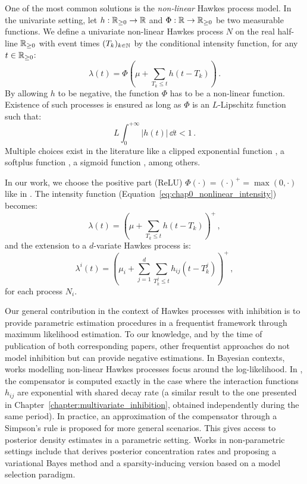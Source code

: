     One of the most common solutions is the \emph{non-linear} Hawkes process model. In the univariate setting, let $h:{\mathbb R}_{\geq 0} \to {\mathbb R}$ and $\Phi:{\mathbb R}\to{\mathbb R}_{\geq 0}$ be two measurable functions. We define a univariate non-linear Hawkes process $N$ on the real half-line ${\mathbb R}_{\geq 0}$ with event times $(T_k)_{k\in{\mathbb N}}$ by the conditional intensity function, for any $t\in{\mathbb R}_{\geq 0}$:
    \begin{equation}\label{eq:chap0_nonlinear_intensity}
      \lambda(t) = \Phi\left(\mu + \sum_{T_k \leq t}{h(t-T_k)}\right)\,.
    \end{equation}
    By allowing $h$ to be negative, the function $\Phi$ has to be a non-linear function. Existence of such processes is ensured as long as $\Phi$ is an $L$-Lipschitz function \parencite[Theorem 1]{Bremaud1996} such that:
    \[L\int_{0}^{+\infty}{\lvert h(t)\rvert\,\dd t} <1\,.\]
    Multiple choices exist in the literature like a clipped exponential function \parencite{Chornoboy1988,Carstensen2010,Gerhard2017}, a softplus function \parencite{Mei2017}, a sigmoid function \parencite{Menon2018}, among others.
    
    In our work, we choose the positive part (ReLU) $\Phi(\cdot) = (\cdot)^+ = \max(0, \cdot)$ like in \textcite{Lemonnier2014, Hansen2015, Lu2018, Costa2020}.
    The intensity function (Equation~\eqref{eq:chap0_nonlinear_intensity}) becomes:
    \begin{equation}\label{eq:chap0_nonlinear_univariate_intensity}
      \lambda(t) = \left(\mu + \sum_{T_k \leq t}{h(t-T_k)}\right)^+\,,
    \end{equation}
    and the extension to a $d$-variate Hawkes process is:
    \begin{equation}\label{eq:chap0_nonlinear_multivariate_intensity}
      \lambda^i(t) = \left(\mu_i + \sum_{j=1}^{d}\sum_{T_k^j \leq t}{h_{ij}(t-T_k^j)}\right)^+\,,
    \end{equation}
    for each process $N_i$.

    Our general contribution in the context of Hawkes processes with inhibition is to provide parametric estimation procedures in a frequentist framework through maximum likelihood estimation.
    To our knowledge, and by the time of publication of both corresponding papers, other frequentist approaches \parencite{Reynaud2014,Bacry2016} do not model inhibition but can provide negative estimations.
    In Bayesian contexts, works modelling non-linear Hawkes processes focus around the log-likelihood. In \textcite{Deutsch2022}, the compensator is computed exactly in the case where the interaction functions $h_{ij}$ are exponential with shared decay rate (a similar result to the one presented in Chapter~\ref{chapter:multivariate_inhibition}, obtained independently
    during the same period). In practice, an approximation of the compensator through a Simpson's rule is proposed for more general scenarios. This gives access to posterior density estimates in a parametric setting. %
    Works in non-parametric settings include \textcite{Sulem2024} that derives posterior concentration rates and \textcite{Sulem2023} proposing a variational Bayes method and a sparsity-inducing version based on a model selection paradigm.

